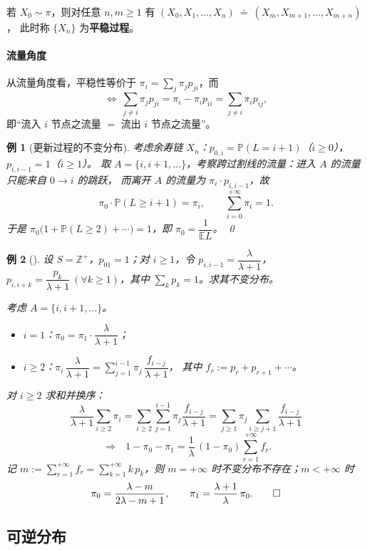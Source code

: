 \documentclass[lang=cn,10pt,newtx,thmcnt=chapter,mode=simple]{vividbook}
\providecommand{\Z}{}\renewcommand{\Z}{\mathbb{Z}}
\providecommand{\E}{}\renewcommand{\E}{\mathbb{E}}
\providecommand{\Pp}{}\renewcommand{\Pp}{\mathbb{P}}
\newcommand{\darr}{\;\Rightarrow\;}
\theoremstyle{vividthm}
\theoremstyle{vividdef}
\theoremstyle{vividexa}
\newtheorem*{vividexample}{例}
\theoremstyle{vividrem}
\newenvironment{example}[1][]{\begin{vividexample}[#1]}{\end{vividexample}}
\begin{document}
若 $X_0\sim\pi$，则对任意 $n,m\ge1$ 有
$(X_0,X_1,\dots,X_n)\ \doteq\ (X_m,X_{m+1},\dots,X_{m+n})$，
此时称 $\{X_n\}$ 为\textbf{平稳过程}。

\paragraph{流量角度}
从流量角度看，平稳性等价于 $\pi_i=\sum_j\pi_jp_{ji}$，而
\[
\iff\ \sum_{j\ne i}\pi_jp_{ji}=\pi_i-\pi_ip_{ii}=\sum_{j\ne i}\pi_ip_{ij},
\]
即“流入 $i$ 节点之流量 $=$ 流出 $i$ 节点之流量”。

\begin{example}[更新过程的不变分布]
考虑余寿链 $X_n$：$p_{0,i}=\Pp(L=i+1)$（$i\ge0$），$p_{i,i-1}=1$（$i\ge1$）。
取 $A=\{i,i+1,\dots\}$，考察跨过割线的流量：进入 $A$ 的流量只能来自 $0\to i$ 的跳跃，
而离开 $A$ 的流量为 $\pi_i\cdot p_{i,i-1}$，故
\[
\pi_0\cdot\Pp(L\ge i+1)=\pi_i,
\qquad
\sum_{i=0}^{+\infty}\pi_i=1 .
\]
于是 $\pi_0\bigl(1+\Pp(L\ge2)+\cdots\bigr)=1$，即 $\pi_0=\dfrac{1}{\E L}$。 \qed
\end{example}

\begin{example}
设 $S=\Z^+$，$p_{01}=1$；对 $i\ge1$，令 $p_{i,i-1}=\dfrac{\lambda}{\lambda+1}$，
$p_{i,i+k}=\dfrac{p_k}{\lambda+1}\ (\forall k\ge1)$，其中 $\sum_k p_k=1$。求其不变分布。

考虑 $A=\{i,i+1,\dots\}$。
\begin{itemize}
  \item $i=1$：$\pi_0=\pi_1\cdot\dfrac{\lambda}{\lambda+1}$；
  \item $i\ge2$：$\pi_i\,\dfrac{\lambda}{\lambda+1}=\sum_{j=1}^{i-1}\pi_j\,\dfrac{f_{i-j}}{\lambda+1}$，
        其中 $f_r:=p_r+p_{r+1}+\cdots$。
\end{itemize}
对 $i\ge2$ 求和并换序：
\[
\frac{\lambda}{\lambda+1}\sum_{i\ge2}\pi_i
=\sum_{i\ge2}\sum_{j=1}^{i-1}\pi_j\frac{f_{i-j}}{\lambda+1}
=\sum_{j\ge1}\pi_j\sum_{i\ge j+1}\frac{f_{i-j}}{\lambda+1}
\]
\[
\darr\ \ 1-\pi_0-\pi_1=\frac{1}{\lambda}\,(1-\pi_0)\sum_{r=1}^{+\infty}f_r .
\]
记 $m:=\sum_{r=1}^{+\infty}f_r=\sum_{k=1}^{+\infty}k\,p_k$，则
$m=+\infty$ 时不变分布不存在；$m<+\infty$ 时
\[
\pi_0=\frac{\lambda-m}{2\lambda-m+1},
\qquad
\pi_1=\frac{\lambda+1}{\lambda}\,\pi_0. \qed
\]
\end{example}

\subsection{可逆分布}
\end{document}
